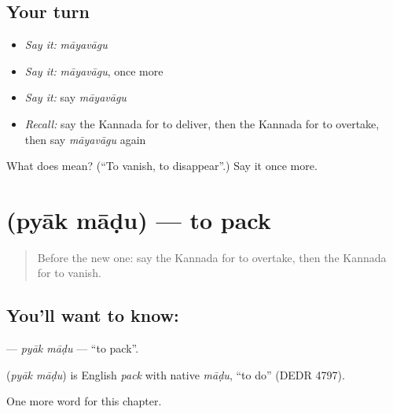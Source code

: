 \subsection*{Your turn}
\begin{itemize}
\raggedright
  \item \emph{Say it:} \emph{māyavāgu}
  \item \emph{Say it:} \emph{māyavāgu}, once more
  \item \emph{Say it:} say \emph{māyavāgu}
  \item \emph{Recall:} say the Kannada for to deliver, then the Kannada for to overtake, then say \emph{māyavāgu} again
\end{itemize}

\begin{tcolorbox}[breakable,colback=teal!4,colframe=teal!35!black,title={Before you move on}]
What does  mean? (\textquotedblleft{}To vanish, to disappear\textquotedblright{}.) Say it once more.
\end{tcolorbox}
\section[\texorpdfstring{\kn{ಪ್ಯಾಕ್} \kn{ಮಾಡು} (pyāk māḍu)}{ಪ್ಯಾಕ್ ಮಾಡು (pyāk māḍu)}]{  (pyāk māḍu) — to pack}

\label{lesson:KA-C281-pyak-madu}



\begin{quote}
Before the new one: say the Kannada for to overtake, then the Kannada for to vanish.
\end{quote}

\subsection*{You'll want to know:  }
\textbf{ } — \emph{pyāk māḍu} — \textquotedblleft{}to pack\textquotedblright{}.

\begin{cousinweb}
\textbf{ } (\emph{pyāk māḍu}) is English \emph{pack} with native \emph{māḍu}, \textquotedblleft{}to do\textquotedblright{} (DEDR 4797).
\end{cousinweb}

\begin{grammarlens}[title={What you've built}]
One more word for this chapter.
\end{grammarlens}

